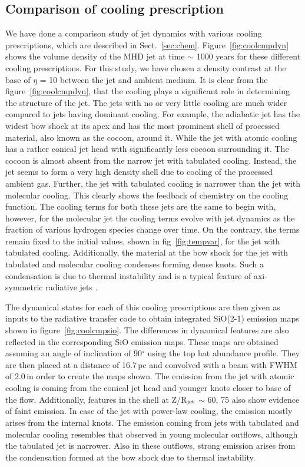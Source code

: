 \documentclass[useAMS,usenatbib]{mn2e}
\begin{document}
\subsection{Comparison of cooling prescription}
\label{ssec:coolres}
We have done a comparison study of jet dynamics with various cooling
prescriptions, which are described in
Sect.~\ref{sec:chem}. Figure~\ref{fig:coolcmpdyn} shows the volume density of the MHD
jet at time $\sim$ 1000 years for these different cooling
prescriptions. For this study, we have chosen a density contrast at the base of
$\eta$ = 10 between the jet and ambient medium.
It is clear from the figure~\ref{fig:coolcmpdyn}, that the cooling plays a
significant role in determining the structure of the jet. The jets
with no or very little cooling are much wider compared to
jets having dominant cooling. For example, the adiabatic jet
has the widest bow shock at its apex and has the most prominent shell
of processed material, also known as the cocoon,
around it. While the jet with atomic cooling has a rather conical
jet head with significantly less cocoon surrounding it. The cocoon is
almost absent from the narrow jet with tabulated cooling. Instead, the jet
seems to form a very high density shell due to cooling of the
processed ambient gas. Further, the jet with tabulated cooling is narrower than the jet with molecular cooling. This clearly
shows the feedback of chemistry on the cooling function. The cooling
terms for both these jets are the same to begin with, however,
for the molecular jet the cooling terms evolve with jet dynamics as the fraction of
various hydrogen species change over time. On the contrary, the terms
remain fixed to the initial values, shown in fig~\ref{fig:tempvar}, for the jet with tabulated
cooling. Additionally, the material at the bow shock for the jet
with tabulated and molecular cooling condenses forming dense knots. 
Such a condensation is due to thermal instability and is 
a typical feature of axi-symmetric radiative jets 
\citep[see, for e.g,][]{Blondin:1990p2130,Cerqueira:1999p15052}.
%

The dynamical states for each of this cooling prescriptions are then 
given as inputs to the radiative transfer code to obtain integrated SiO(2-1) emission
maps shown in figure~\ref{fig:coolcmpsio}. The differences in dynamical
features are also reflected in the corresponding SiO emission
maps. These maps are obtained assuming an angle of inclination of
90$^\circ$ using the top hat abundance
profile. They are then placed at a distance of
16.7$\,$pc and convolved with a beam with FWHM of 2.0\arcsec\,in order
to create the maps shown. 
The emission from the jet with atomic
cooling is coming from the conical jet head and younger knots closer
to base of the flow. Additionally, features in the shell at Z/R$_{\rm jet}$ $\sim$
60, 75 also show evidence of faint emission. In case of the jet with
power-law cooling, the emission mostly arises from the
internal knots. 
The emission coming from jets with
tabulated and molecular cooling resembles that observed in young
molecular outflows, although the tabulated jet is narrower.
Also in these outflows, strong emission arises from the
condensation formed at the bow shock due to thermal
instability. 
%
\end{document}
